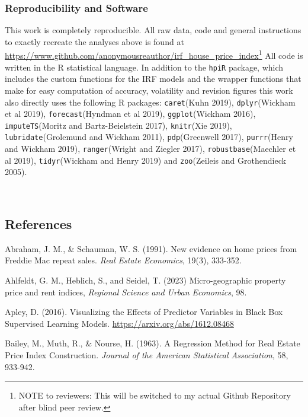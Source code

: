 \documentclass[
]{article}
\begin{document}
\hypertarget{reproducibility-and-software}{%
\subsubsection{Reproducibility and
Software}\label{reproducibility-and-software}}

This work is completely reproducible. All raw data, code and general
instructions to exactly recreate the analyses above is found at
\href{www.github.com/anonymousreauthor/irf_house_price_index}{https://www.github.com/anonymousreauthor/irf\_house\_price\_index}\footnote{NOTE
  to reviewers: This will be switched to my actual Github Repository
  after blind peer review.} All code is written in the R statistical
language. In addition to the \texttt{hpiR} package, which includes the
custom functions for the IRF models and the wrapper functions that make
for easy computation of accuracy, volatility and revision figures this
work also directly uses the following R packages: \texttt{caret}(Kuhn
2019), \texttt{dplyr}(Wickham et al 2019), \texttt{forecast}(Hyndman et
al 2019), \texttt{ggplot}(Wickham 2016), \texttt{imputeTS}(Moritz and
Bartz-Beielstein 2017), \texttt{knitr}(Xie 2019),
\texttt{lubridate}(Grolemund and Wickham 2011), \texttt{pdp}(Greenwell
2017), \texttt{purrr}(Henry and Wickham 2019), \texttt{ranger}(Wright
and Ziegler 2017), \texttt{robustbase}(Maechler et al 2019),
\texttt{tidyr}(Wickham and Henry 2019) and \texttt{zoo}(Zeileis and
Grothendieck 2005).

~ ~

\pagebreak

\hypertarget{references}{%
\subsection{References}\label{references}}

Abraham, J. M., \& Schauman, W. S. (1991). New evidence on home prices
from Freddie Mac repeat sales. \emph{Real Estate Economics}, 19(3),
333-352.

Ahlfeldt, G. M., Heblich, S., and Seidel, T. (2023) Micro-geographic
property price and rent indices, \emph{Regional Science and Urban
Economics}, 98.

Apley, D. (2016). Visualizing the Effects of Predictor Variables in
Black Box Supervised Learning Models.
\href{arxiv.org/abs/1612.08468}{https://arxiv.org/abs/1612.08468}

Bailey, M., Muth, R., \& Nourse, H. (1963). A Regression Method for Real
Estate Price Index Construction. \emph{Journal of the American
Statistical Association}, 58, 933-942.
\end{document}
